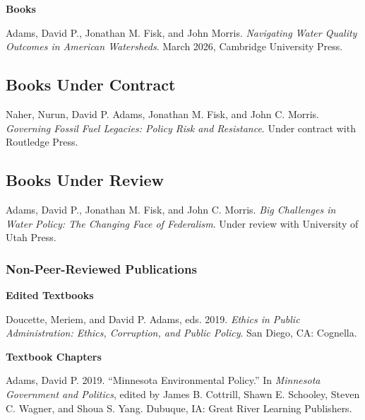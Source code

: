 \documentclass[11pt,letterpaper]{article}
\renewenvironment{itemize}{
  \begin{list}{}{
    \setlength{\leftmargin}{1.5em}
    \setlength{\itemsep}{0.25em}
    \setlength{\parskip}{0pt}
    \setlength{\parsep}{0.25em}
  }
}{
  \end{list}
}
\begin{document}
\textbf{Books}
\begin{itemize}\leftmargin=2pt\itemindent=-15pt
  \item Adams, David P., Jonathan M. Fisk, and John Morris. \emph{Navigating Water Quality Outcomes in American Watersheds}. March 2026, Cambridge University Press.
\end{itemize}

\subsection*{Books Under Contract}

\begin{itemize}\leftmargin=2pt\itemindent=-15pt
  \item Naher, Nurun, David P. Adams, Jonathan M. Fisk, and John C. Morris. \emph{Governing Fossil Fuel
  Legacies: Policy Risk and Resistance}. Under contract with Routledge Press.
\end{itemize}

\subsection*{Books Under Review}
\begin{itemize}\leftmargin=2pt\itemindent=-15pt
  \item Adams, David P., Jonathan M. Fisk, and John C. Morris. \emph{Big Challenges in Water Policy: The Changing Face of Federalism}. Under review with University of Utah Press.
\end{itemize}

\subsubsection*{Non-Peer-Reviewed Publications}

\textbf{Edited Textbooks}
\begin{itemize}\leftmargin=2pt\itemindent=-15pt
    \item Doucette, Meriem, and David P. Adams, eds. 2019. \emph{Ethics in Public Administration: Ethics, Corruption, and Public Policy}. San Diego, CA: Cognella.
\end{itemize}

\textbf{Textbook Chapters}
\begin{itemize}\leftmargin=2pt\itemindent=-15pt
    \item Adams, David P. 2019. ``Minnesota Environmental Policy.'' In \emph{Minnesota Government and Politics}, edited by James B. Cottrill, Shawn E. Schooley, Steven C. Wagner, and Shoua S. Yang. Dubuque, IA: Great River Learning Publishers.
\end{itemize}
\end{document}
